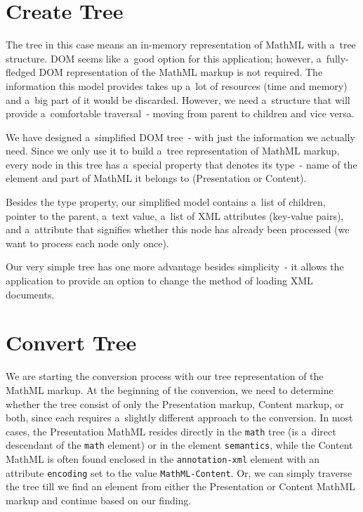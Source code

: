 \documentclass[11pt,oneside,final]{fithesis2}
\def\s#1{#1\index{#1}}
\begin{document}
\section{Create Tree}
\label{section:createtree}
The tree in this case means an in-memory representation of \s{MathML} with a~tree structure. \s{DOM} seems like a~good option for this application; however, a~fully-fledged DOM representation of the MathML markup is not required. The information this model provides takes up a~lot of resources (time and memory) and a~big part of it would be discarded. However, we need a~structure that will provide a~comfortable traversal~- moving from parent to children and vice versa.

We have designed a~simplified DOM tree~- with just the information we actually need. Since we only use it to build a~tree representation of MathML markup, every node in this tree has a~special property that denotes its type~- name of the element and part of MathML it belongs to (Presentation or Content). 

Besides the type property, our simplified model contains a~list of children, pointer to the parent, a~text value, a~list of XML attributes (key-value pairs), and a~attribute that signifies whether this node has already been processed (we want to process each node only once).

Our very simple tree has one more advantage besides simplicity~- it allows the application to provide an option to change the method of loading XML documents.

\section{Convert Tree}
We are starting the conversion process with our tree representation of the MathML markup. At the beginning of the conversion, we need to determine whether the tree consist of only the Presentation markup, Content markup, or both, since each requires a~slightly different approach to the conversion. In most cases, the Presentation MathML resides directly in the \texttt{math} tree (is a~direct descendant of the \texttt{math} element) or in the element \texttt{semantics}, while the Content MathML is often found enclosed in the \texttt{annotation-xml} element with an attribute \texttt{encoding} set to the value \texttt{MathML-Content}. Or, we can simply traverse the tree till we find an element from either the Presentation or Content MathML markup and continue based on our finding.
\end{document}
